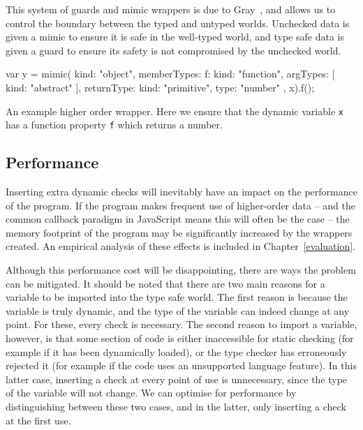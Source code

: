 \documentclass[12pt,a4paper,twoside,openright]{report}
\theoremstyle{definition}
\theoremstyle{dotless}
\begin{document}
This system of guards and mimic wrappers is due to
Gray~\cite{gradGray,gray2005fine}, and allows us to control the boundary between the typed
and untyped worlds. Unchecked data is given a mimic to ensure it is safe in the
well-typed world, and type safe data is given a guard to ensure its safety is
not compromised by the unchecked world.

\begin{listing}
  \begin{jscript}
	var y = mimic({
	  kind: "object",
	  memberTypes: {
	    f: {
	      kind: "function",
	      argTypes: [ {
	        kind: "abstract"
	      } ],
	      returnType: {
	        kind: "primitive",
	        type: "number"
	      }
	    }
	  }
	}, x).f();
  \end{jscript}
  \caption[An example higher order wrapper]{An example higher order wrapper. Here we ensure that the
  	dynamic variable \texttt{x} has a function property \texttt{f} which returns a number.}
  \label{lst:importPrim}
\end{listing}

\subsection{Performance}

Inserting extra dynamic checks will inevitably have an impact on the
performance of the program. If the program makes frequent use of higher-order
data -- and the common callback paradigm in JavaScript means this will often be
the case -- the memory footprint of the program may be significantly increased
by the wrappers created. An empirical analysis of these effects is included in
Chapter~\ref{evaluation}.

Although this performance cost will be disappointing, there are ways the
problem can be mitigated. It should be noted that there are two main reasons
for a variable to be imported into the type safe world. The first reason is
because the variable is truly dynamic, and the type of the variable can indeed
change at any point. For these, every check is necessary. The second reason to
import a variable, however, is that some section of code is either inaccessible
for static checking (for example if it has been dynamically loaded), or the
type checker has erroneously rejected it (for example if the code uses an
unsupported language feature). In this latter case, inserting a check at every
point of use is unnecessary, since the type of the variable will not change. We
can optimise for performance by distinguishing between these two cases, and in
the latter, only inserting a check at the first use.
\end{document}
